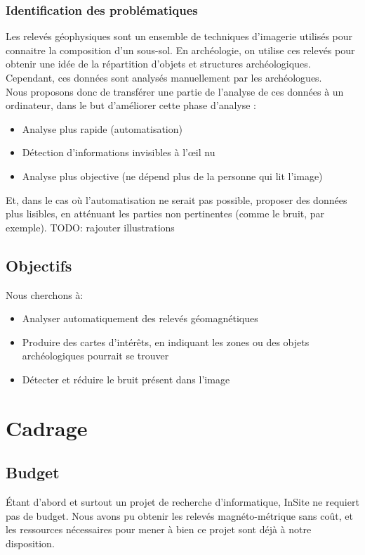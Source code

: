 \documentclass[a4paper, 12pt, titlepage, oneside, french]{article}
\begin{document}
		\subsubsection{Identification des problématiques}
		Les relevés géophysiques sont un ensemble de techniques d'imagerie utilisés pour connaitre la composition d'un sous-sol.
		En archéologie, on utilise ces relevés pour obtenir une idée de la répartition d'objets et structures archéologiques.
		Cependant, ces données sont analysés manuellement par les archéologues. \\
		Nous proposons donc de transférer une partie de l'analyse de ces données à un ordinateur, dans le but d'améliorer cette phase d'analyse :
		\begin{itemize}
			\item Analyse plus rapide (automatisation)
			\item Détection d'informations invisibles à l'œil nu
			\item Analyse plus objective (ne dépend plus de la personne qui lit l'image)
		\end{itemize}
		Et, dans le cas où l'automatisation ne serait pas possible, proposer des données plus lisibles, en atténuant les parties non pertinentes (comme le bruit, par exemple).
		{TODO: rajouter illustrations}

	\subsection{Objectifs}%
	Nous cherchons à:
	\begin{itemize}
		\item Analyser automatiquement des relevés géomagnétiques 
		\item Produire des cartes d'intérêts, en indiquant les zones ou des objets archéologiques pourrait se trouver
		\item Détecter et réduire le bruit présent dans l'image
	\end{itemize}

	\newpage

\section{Cadrage}
	\subsection{Budget}
	Étant d'abord et surtout un projet de recherche d'informatique, InSite ne requiert pas de budget. Nous avons pu obtenir les relevés magnéto-métrique sans coût, et les ressources nécessaires pour mener à bien ce projet sont déjà à notre disposition. 
\end{document}
